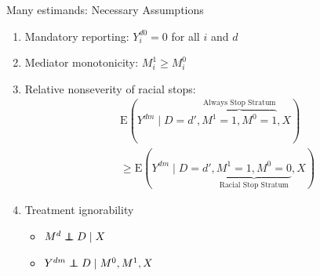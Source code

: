 \documentclass{beamer}
\def\independenT#1#2{\mathrel{\rlap{$#1#2$}\mkern2mu{#1#2}}}
\newcommand\indep{\protect\mathpalette{\protect\independenT}{\perp}}
\newcommand\E{\text{E}}
\begin{document}
\begin{frame}{Many estimands: Necessary Assumptions}

\begin{enumerate}
\item Mandatory reporting: $Y_i^{d0} = 0$ for all $i$ and $d$
\item Mediator monotonicity: $M_i^1\geq M_i^0$
\item Relative nonseverity of racial stops:
$$\begin{aligned}
&\E(Y^{dm}\mid D = d', \overbrace{M^1 = 1, M^0 = 1}^\text{Always Stop Stratum}, X) \\
&\geq \E(Y^{dm}\mid D = d',\underbrace{M^1 = 1, M^0 = 0}_\text{Racial Stop Stratum}, X)
\end{aligned}$$
\item Treatment ignorability
\begin{itemize}
\item $M^d\indep D\mid X$
\item $Y^{dm}\indep D\mid M^0, M^1, X$
\end{itemize}
\end{enumerate}

\end{frame}

\end{document}
